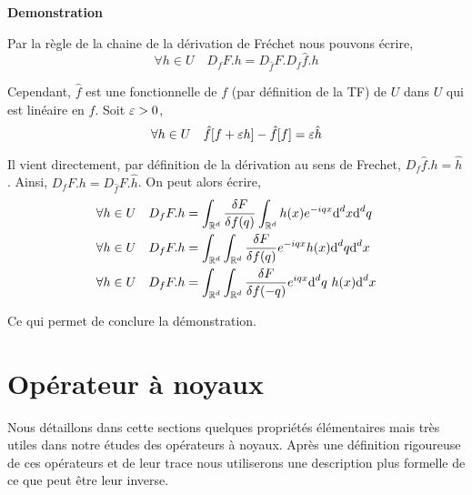 \documentclass[10pt]{article}
\begin{document}
\begin{multicols}{2}
\vspace*{11pt}
\textbf{Demonstration}

Par la règle de la chaine de la dérivation de Fréchet nous pouvons écrire, 
\begin{equation}
  \forall h \in U \quad D_fF.h = D_{\hat{f}}F. D_f \hat{f}.h
\end{equation}



Cependant, $\hat{f}$ est une fonctionnelle de $f$ (par définition de la TF) de $U$ dans $U$ qui est linéaire en $f$. Soit $\varepsilon >0$, 
\begin{equation}
  \forall h \in U \quad \hat{f}[f + \varepsilon h] - \hat{f}[f] = \varepsilon \hat{h} 
\end{equation} 

Il vient directement, par définition de la dérivation au sens de Frechet, $D_f\hat{f} .h = \hat{h}$.  
Ainsi,  $D_f F .h = D_{\hat{f}}F.\hat{h}$.  On peut alors écrire, 
\begin{align}
  \forall h \in U  \quad D_f F .h & = \int_{\mathbb{R}^d} \frac{\delta F}{\delta f(q)} \int_{\mathbb{R}^d} h(x) e^{-iqx} \text{d}^d x \text{d}^d q \\
  \forall h \in U  \quad D_f F .h & = \int_{\mathbb{R}^d} \int_{\mathbb{R}^d} \frac{\delta F}{\delta f(q)} e^{-iqx} h(x) \text{d}^d q \text{d}^d x \\
  \forall h \in U  \quad D_f F .h & = \int_{\mathbb{R}^d} \int_{\mathbb{R}^d} \frac{\delta F}{\delta f(-q)} e^{iqx} \text{d}^d q \text{ } h(x) \text{d}^d x
\end{align}

Ce qui permet de conclure la démonstration.

\vspace*{11pt}

\end{multicols}


\pagebreak

\section{Opérateur à noyaux}

Nous détaillons dans cette sections quelques propriétés élémentaires mais très utiles dans notre études des opérateurs à noyaux. Après une définition rigoureuse de ces opérateurs et de leur trace nous utiliserons une description plus formelle de ce que peut être leur inverse.\\
\end{document}
